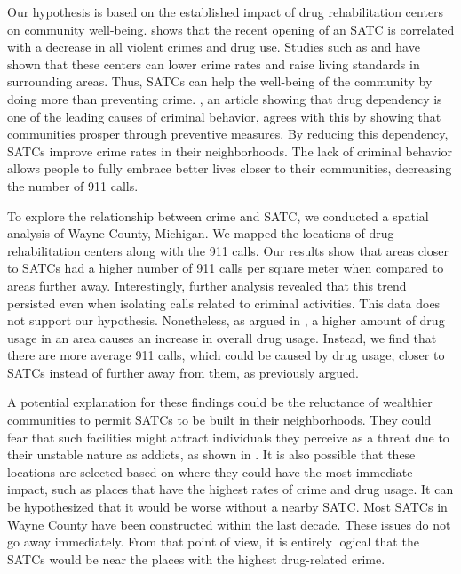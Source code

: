 \documentclass[12pt]{article}
\begin{document}
Our hypothesis is based on the established impact of drug rehabilitation centers on community well-being. \cite{SAT_centers_and_crime} shows that the recent opening of an SATC is correlated with a decrease in all violent crimes and drug use. Studies such as \cite{drugs_and_crime}
and \cite{drugs_crime_space_time} have shown that these centers can lower crime rates and raise living standards in surrounding areas. Thus, SATCs can help the well-being of the community by doing more than preventing crime. \cite{mental_healthcare_and_crime}, an article showing that drug dependency is one of the leading causes of criminal behavior, agrees with this by showing that communities prosper through preventive measures. By reducing this dependency, SATCs improve crime rates in their neighborhoods. The lack of criminal behavior allows people to fully embrace better lives closer to their communities, decreasing the number of 911 calls. 

To explore the relationship between crime and SATC, we conducted a spatial analysis of Wayne County, Michigan. We mapped the locations of drug rehabilitation centers along with the 911 calls. Our results show that areas closer to SATCs had a higher number of 911 calls per square meter when compared to areas further away. Interestingly, further analysis revealed that this trend persisted even when isolating calls related to criminal activities. This data does not support our hypothesis. Nonetheless, as argued in \cite{Socioeconomic-Determinants}, a higher amount of drug usage in an area causes an increase in overall drug usage. Instead, we find that there are more average 911 calls, which could be caused by drug usage, closer to SATCs instead of further away from them, as previously argued. 

A potential explanation for these findings could be the reluctance of wealthier communities to permit SATCs to be built in their neighborhoods. They could fear that such facilities might attract individuals they perceive as a threat due to their unstable nature as addicts, as shown in \cite{mental_health_and_disability}. It is also possible that these locations are selected based on where they could have the most immediate impact, such as places that have the highest rates of crime and drug usage. It can be hypothesized that it would be worse without a nearby SATC. Most SATCs in Wayne County have been constructed within the last decade. These issues do not go away immediately. From that point of view, it is entirely logical that the SATCs would be near the places with the highest drug-related crime.
\end{document}

